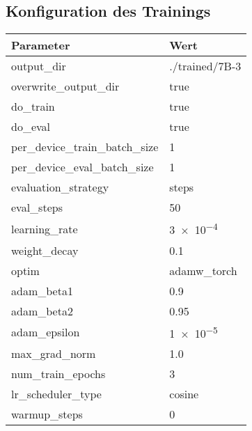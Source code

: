 \subsection{Konfiguration des Trainings}\label{subsec:config-training}
\begin{table}
    \centering
    \begin{tabular}{ll}
        \toprule
        \textbf{Parameter}              & \textbf{Wert}                      \\
        \midrule
        output\_dir                     & ./trained/7B-3                     \\
        overwrite\_output\_dir          & true                               \\
        do\_train                       & true                               \\
        do\_eval                        & true                               \\
        per\_device\_train\_batch\_size & 1                                  \\
        per\_device\_eval\_batch\_size  & 1                                  \\
        evaluation\_strategy            & steps                              \\
        eval\_steps                     & 50                                 \\
        learning\_rate                  & \num{3e-4}                         \\
        weight\_decay                   & \SI{0.1}{}                         \\
        optim                           & adamw\_torch                       \\
        adam\_beta1                     & \SI{0.9}{}                         \\
        adam\_beta2                     & \SI{0.95}{}                        \\
        adam\_epsilon                   & \num{1e-5}                         \\
        max\_grad\_norm                 & \SI{1.0}{}                         \\
        num\_train\_epochs              & 3                                  \\
        lr\_scheduler\_type             & cosine                             \\
        warmup\_steps                   & 0                                  \\

\end{tabular}
\end{table}
